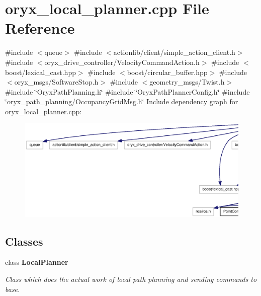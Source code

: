 \section{oryx\-\_\-local\-\_\-planner.\-cpp \-File \-Reference}
\label{oryx__local__planner_8cpp}
{\ttfamily \#include $<$queue$>$}\*
{\ttfamily \#include $<$actionlib/client/simple\-\_\-action\-\_\-client.\-h$>$}\*
{\ttfamily \#include $<$oryx\-\_\-drive\-\_\-controller/\-Velocity\-Command\-Action.\-h$>$}\*
{\ttfamily \#include $<$boost/lexical\-\_\-cast.\-hpp$>$}\*
{\ttfamily \#include $<$boost/circular\-\_\-buffer.\-hpp$>$}\*
{\ttfamily \#include $<$oryx\-\_\-msgs/\-Software\-Stop.\-h$>$}\*
{\ttfamily \#include $<$geometry\-\_\-msgs/\-Twist.\-h$>$}\*
{\ttfamily \#include \char`\"{}\-Oryx\-Path\-Planning.\-h\char`\"{}}\*
{\ttfamily \#include \char`\"{}\-Oryx\-Path\-Planner\-Config.\-h\char`\"{}}\*
{\ttfamily \#include \char`\"{}oryx\-\_\-path\-\_\-planning/\-Occupancy\-Grid\-Msg.\-h\char`\"{}}\*
\-Include dependency graph for oryx\-\_\-local\-\_\-planner.\-cpp\-:
\nopagebreak
\begin{figure}[H]
\begin{center}
\leavevmode
\includegraphics[width=350pt]{oryx__local__planner_8cpp__incl}
\end{center}
\end{figure}
\subsection*{\-Classes}
\begin{DoxyCompactItemize}
\item 
class {\bf \-Local\-Planner}
\begin{DoxyCompactList}\small\item\em \-Class which does the actual work of local path planning and sending commands to base. \end{DoxyCompactList}\end{DoxyCompactItemize}
